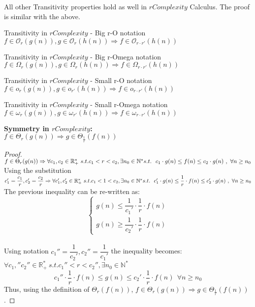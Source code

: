 All other Transitivity properties hold as well in $rComplexity$ Calculus. The proof is similar with the above.
\begin{theorem} Transitivity in $rComplexity$ - Big r-O notation 
 $ f \in \mathcal{O}_{r}(g(n)),  g \in \mathcal{O}_{r}(h(n)) \Rightarrow  f \in \mathcal{O}_{r \cdot r'}(h(n))$
\end{theorem}
\begin{theorem} Transitivity in $rComplexity$ - Big r-Omega notation 
 $ f \in \Omega_{r}(g(n)),  g \in \Omega_{r}(h(n)) \Rightarrow  f \in \Omega_{r \cdot r'}(h(n))$
\end{theorem}
\begin{theorem} Transitivity in $rComplexity$ - Small r-O notation 
 $ f \in o_{r}(g(n)),  g \in o_{r'}(h(n)) \Rightarrow  f \in o_{r \cdot r'}(h(n))$
\end{theorem}
\begin{theorem} Transitivity in $rComplexity$ - Small r-Omega notation 
 $ f \in \omega_{r}(g(n)),  g \in \omega_{r'}(h(n)) \Rightarrow  f \in \omega_{r \cdot r'}(h(n))$
\end{theorem}

\begin{theorem} 
 \textbf{Symmetry in $rComplexity$:}  \\  $ f \in \Theta_{r}(g(n)) \Rightarrow g \in \Theta_{\frac{1}{r}}(f(n)) $
\end{theorem} 

\begin{proof} 
$ f \in \Theta_{r}(g(n)) \Rightarrow \forall c_{1}, c_{2} \in \mathbb{R}^{*}_{+} \ s.t.  c_{1}< r < c_{2} , \exists n_{0} \in \mathbb{N}^{*}\ \\ s.t.\ \ c_{1} \cdot g(n) \leq f(n) \leq c_{2} \cdot g(n)\ ,\  \forall n \geq n_{0} $
\\ Using the substitution $c_{1}' = \dfrac{c_{1}}{r}, c_{2}' = \dfrac{c_{2}}{r} \Rightarrow \forall c_{1}', c_{2}' \in \mathbb{R}^{*}_{+} \ s.t.  c_{1} < 1 < c_{2} , \exists n_{0} \in \mathbb{N}^{*}\ \\ s.t.\ \ c_{1}' \cdot g(n) \leq \dfrac{1}{r} \cdot f(n) \leq c_{2}' \cdot g(n)\ ,\  \forall n \geq n_{0} $
\\ The previous inequality can be re-written as: 
\[\begin{cases} g(n) \leq \dfrac{1}{c_{1}'} \cdot \dfrac{1}{r} \cdot f(n) \\ g(n) \geq \dfrac{1}{c_{2}'} \cdot \dfrac{1}{r} \cdot f(n)
 \end{cases}\]
 \\ Using notation $c_{1}'' = \dfrac{1}{c_{2}'}, c_{2}'' = \dfrac{1}{c_{1}'}$ the inequality becomes:  \\
 $\forall c_{1},'' c_{2}'' \in \mathbb{R}^{*}_{+} \ s.t.  c_{1}'' < r < c_{2}'' , \exists n_{0} \in \mathbb{N}^{*}\ $
 \[ {c_{1}''} \cdot \dfrac{1}{r} \cdot f(n) \leq g(n) \leq {c_{2}'} \cdot \dfrac{1}{r} \cdot f(n)\ \ \forall n \geq n_{0} \]
 Thus, using the definition of $ \Theta_{r}(f(n))$, $ f \in \Theta_{r}(g(n)) \Rightarrow g \in \Theta_{\frac{1}{r}}(f(n)) $.
\end{proof} 


